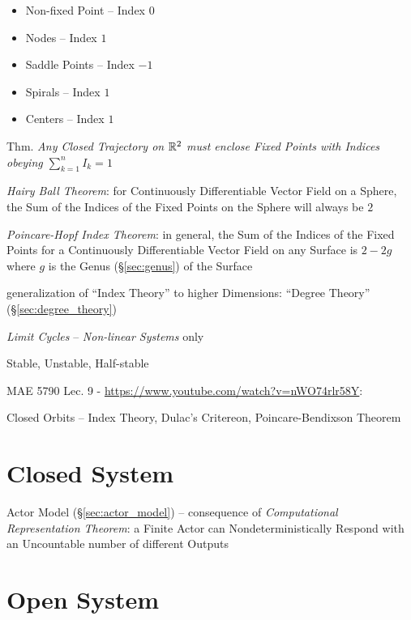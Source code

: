 \begin{itemize}
  \item Non-fixed Point -- Index $0$
  \item Nodes -- Index $1$
  \item Saddle Points -- Index $-1$
  \item Spirals -- Index $1$
  \item Centers -- Index $1$
\end{itemize}

Thm. \emph{Any Closed Trajectory on $\mathbb{R}^2$ must enclose Fixed Points with
  Indices obeying $\sum_{k=1}^n I_k = 1$}

\emph{Hairy Ball Theorem}: for Continuously Differentiable Vector Field
on a Sphere, the Sum of the Indices of the Fixed Points on the Sphere will
always be $2$

\emph{Poincare-Hopf Index Theorem}: in general, the Sum of the Indices of the
Fixed Points for a Continuously Differentiable Vector Field on any Surface is
$2 - 2g$ where $g$ is the Genus (\S\ref{sec:genus}) of the Surface

generalization of ``Index Theory'' to higher Dimensions: ``Degree Theory''
(\S\ref{sec:degree_theory})


\asterism

\emph{Limit Cycles} -- \emph{Non-linear Systems} only

Stable, Unstable, Half-stable


MAE 5790 Lec. 9 - \url{https://www.youtube.com/watch?v=nWO74rlr58Y}:

Closed Orbits -- Index Theory, Dulac's Critereon, Poincare-Bendixson Theorem



\section{Closed System}\label{sec:closed_system}


Actor Model (\S\ref{sec:actor_model}) -- consequence of \emph{Computational
  Representation Theorem}: a Finite Actor can Nondeterministically Respond with
an Uncountable number of different Outputs %



\section{Open System}\label{sec:open_system}

